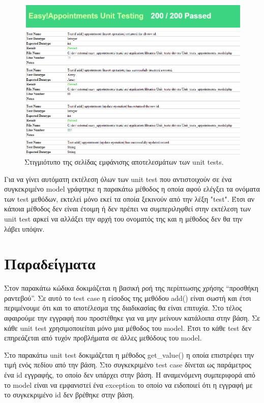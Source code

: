 \begin{figure}[h]
\centering
\includegraphics[width=150mm]{images/ea-unit-testing.png}
\caption{Στιγμιότυπο της σελίδας εμφάνισης αποτελεσμάτων των unit tests.}
\label{ea-unit-testing}
\end{figure}

Για να γίνει αυτόματη εκτέλεση όλων των unit test που αντιστοιχούν σε ένα συγκεκριμένο model γράφτηκε η παρακάτω μέθοδος η οποία αφού ελέγξει τα ονόματα των test μεθόδων, εκτελεί μόνο εκεί τα οποία ξεκινούν από την λέξη "test". Έτσι αν κάποια μέθοδος δεν είναι έτοιμη ή δεν πρέπει να συμπεριληφθεί στην εκτέλεση των unit test αρκεί να αλλάξει την αρχή του ονοματός της και η μέθοδος δεν θα την λάβει υπόψιν.

 

\section {Παραδείγματα} 
Στον παρακάτω κώδικα δοκιμάζεται η βασική ροή της περίπτωσης χρήσης “προσθήκη ραντεβού”. Σε αυτό το test case η είσοδος της μεθόδου add() είναι σωστή και έτσι περιμένουμε ότι και το αποτέλεσμα  της διαδικασίας θα είναι επιτυχία. Στο τέλος αφαιρούμε την εγγραφή που προστέθηκε για να μην μείνουν κατάλοιπα στην βάση.  Σε κάθε unit test χρησιμοποιείται μόνο μια μέθοδος του model. Έτσι το κάθε test δεν επηρεάζεται από τυχόν προβλήματα σε άλλες μεθόδους του model.



Στο παρακάτω unit test δοκιμάζεται η μέθοδος get\_value() η οποία επιστρέφει την τιμή ενός πεδίου από την βάση. Στο συγκεκριμένο test case δίνεται ως παράμετρος ένα id εγγραφής, το οποίο δεν υπάρχει στην βάση. Η αναμενόμενη συμπεριφορά από το model είναι να εμφανιστεί ένα exception το οποίο να ειδοποιεί ότι η εγγραφή με το συγκεκριμένο id δεν βρέθηκε στην βάση.

